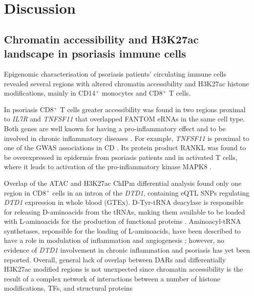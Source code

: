 \section{Discussion}

\subsection{Chromatin accessibility and H3K27ac landscape in psoriasis immune cells}

Epigenomic characterisation of psoriasis patients' circulating immune cells revealed several regions with altered chromatin accessibility and H3K27ac histone modifications, mainly in CD14$^+$ monocytes and CD8$^+$ T cells.


In psoriasis CD8$^+$ T cells greater accessibility was found in two regions proximal to \textit{IL7R} and \textit{TNFSF11} that overlapped FANTOM eRNAs in the same cell type. Both genes are well known for having a pro-inflammatory effect and to be involved in chronic inflammatory diseases \parencite{Gregory2007,Cortes2011}. For example, \textit{TNFSF11} is proximal to one of the GWAS associations in CD  \parencite{Franke2010}. Its protein product RANKL was found to be overexpressed in epidermis from psoriasis patients and in activated T cells, where it leads to activation of the pro-inflammatory kinase MAPK8 \parencite{Toberer2011,Wong1997}. 

Overlap of the ATAC and H3K27ac ChIPm differential analysis found only one region in CD8$^+$ cells in an intron of the \textit{DTD1}, containing eQTL SNPs regulating \textit{DTD1} expression in whole blood (GTEx). D-Tyr-tRNA deacylase is responsible for releasing D-aminoacids from the tRNAs, making them available to be loaded with L-aminoacids for the production of functional proteins \parencite{Bhatt2016}. Aminoacyl‐tRNA synthetases, reponsible for the loading of L-aminoacids, have been described to have a role in modulation of inflammation and angiogenesis \parencite{Yao2013}; however, no evidence of \textit{DTD1} involvement in chronic inflammation and psoriasis has yet been reported. Overall, general lack of overlap between DARs and differentially H3K27ac modified regions is not unexpected since chromatin accessibility is the result of a complex network of interactions between a number of histone modifications, TFs, and structural proteins

